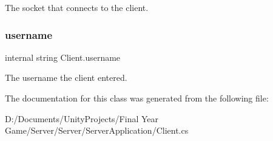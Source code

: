 The socket that connects to the client. 

\mbox{\label{class_client_a39cd630c426203cd9b745af7e69260a9}} 
\subsubsection{\texorpdfstring{username}{username}}
{\footnotesize\ttfamily internal string Client.\+username\hspace{0.3cm}{\ttfamily [private]}}



The username the client entered. 



The documentation for this class was generated from the following file\+:\begin{DoxyCompactItemize}
\item 
D\+:/\+Documents/\+Unity\+Projects/\+Final Year Game/\+Server/\+Server/\+Server\+Application/Client.\+cs\end{DoxyCompactItemize}
